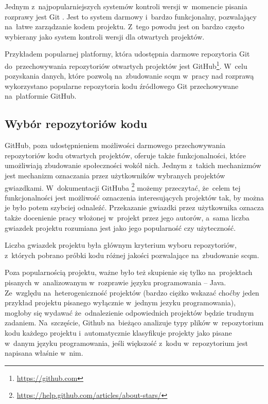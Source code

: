 \documentclass[twoside]{praca}
\begin{document}
Jednym z~najpopularniejszych systemów kontroli wersji w~momencie pisania rozprawy jest Git \cite{gitbook}. Jest to system darmowy i~bardzo funkcjonalny, pozwalający na~łatwe zarządzanie kodem projektu. Z~tego powodu jest on bardzo często wybierany jako system kontroli wersji dla otwartych projektów.

Przykładem popularnej platformy, która udostępnia darmowe repozytoria Git do~przechowywania repozytoriów otwartych projektów jest GitHub\footnote{\url{https://github.com}}. W~celu pozyskania danych, które pozwolą na~zbudowanie \gls{scqm} w~pracy nad rozprawą wykorzystano popularne repozytoria kodu źródłowego Git przechowywane na~platformie GitHub.


\subsection{Wybór repozytoriów kodu}
\label{sec:impl:wybor-github}

GitHub, poza udostępnieniem możliwości darmowego przechowywania repozytoriów kodu otwartych projektów, oferuje także funkcjonalności, które umożliwiają zbudowanie społeczności wokół nich. Jednym z~takich mechanizmów jest mechanizm oznaczania przez użytkowników wybranych projektów gwiazdkami. W~dokumentacji GitHuba \cite{githubdocs}\footnote{\url{https://help.github.com/articles/about-stars/}} możemy przeczytać, że~celem tej funkcjonalności jest możliwość oznaczenia interesujących projektów tak, by można je było potem szybciej odnaleźć. Przekazanie gwiazdki przez użytkownika oznacza także docenienie pracy włożonej w~projekt przez jego autorów, a~sama liczba gwiazdek projektu rozumiana jest jako jego popularność czy użyteczność.

Liczba gwiazdek projektu była głównym kryterium wyboru repozytoriów, z~których pobrano próbki kodu różnej jakości pozwalające na~zbudowanie \gls{scqm}. 

Poza popularnością projektu, ważne było też skupienie się tylko na~projektach pisanych w~analizowanym w~rozprawie języku programowania -- Java. Ze~względu na~heterogeniczność projektów (bardzo ciężko wskazać choćby jeden przykład projektu pisanego wyłącznie w~jednym jezyku programowania), mogłoby się wydawać że~odnalezienie odpowiednich projektów będzie trudnym zadaniem. Na~szczęście, Github na~bieżąco analizuje typy plików w~repozytorium kodu każdego projektu i~automatycznie klasyfikuje projekty jako pisane w~danym języku programowania, jeśli większość z~kodu w~repozytorium jest napisana właśnie w~nim.
\end{document}
